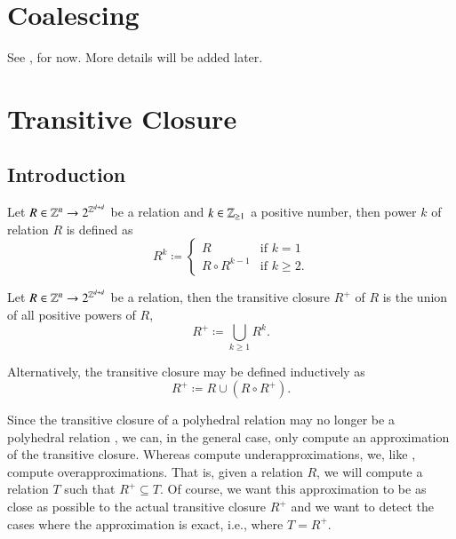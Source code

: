 \section{Coalescing}\label{s:coalescing}

See \textcite{Verdoolaege2009isl}, for now.
More details will be added later.

\section{Transitive Closure}

\subsection{Introduction}

\begin{definition}
Let $R \in \mathbb{Z}^n \to 2^{\mathbb{Z}^{d+d}}$ be a relation and
$k \in \mathbb{Z}_{\ge 1}$
a positive number, then power $k$ of relation $R$ is defined as
\begin{equation}
\label{eq:transitive:power}
R^k \coloneqq
\begin{cases}
R & \text{if $k = 1$}
\\
R \circ R^{k-1} & \text{if $k \ge 2$}
.
\end{cases}
\end{equation}
\end{definition}

\begin{definition}
Let $R \in \mathbb{Z}^n \to 2^{\mathbb{Z}^{d+d}}$ be a relation,
then the transitive closure $R^+$ of $R$ is the union
of all positive powers of $R$,
$$
R^+ \coloneqq \bigcup_{k \ge 1} R^k
.
$$
\end{definition}
Alternatively, the transitive closure may be defined
inductively as
\begin{equation}
\label{eq:transitive:inductive}
R^+ \coloneqq R \cup \left(R \circ R^+\right)
.
\end{equation}

Since the transitive closure of a polyhedral relation
may no longer be a polyhedral relation \parencite{Kelly1996closure},
we can, in the general case, only compute an approximation
of the transitive closure.
Whereas \textcite{Kelly1996closure} compute underapproximations,
we, like \textcite{Beletska2009}, compute overapproximations.
That is, given a relation $R$, we will compute a relation $T$
such that $R^+ \subseteq T$.  Of course, we want this approximation
to be as close as possible to the actual transitive closure
$R^+$ and we want to detect the cases where the approximation is
exact, i.e., where $T = R^+$.

